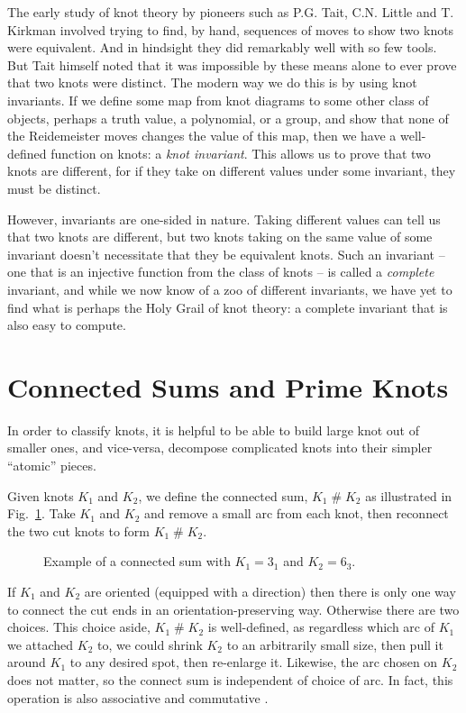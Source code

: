 \documentclass[12pt]{report}
\newcommand{\hash}{\ensuremath{\mathbin{\#}}}
\theoremstyle{upright}
\begin{document}
The early study of knot theory by pioneers such as P.G. Tait, C.N. Little and T. Kirkman involved trying to find, by hand, sequences of moves to show two knots were equivalent. And in hindsight they did remarkably well with so few tools. But Tait himself noted that it was impossible by these means alone to ever prove that two knots were distinct. The modern way we do this is by using knot invariants. If we define some map from knot diagrams to some other class of objects, perhaps a truth value, a polynomial, or a group, and show that none of the Reidemeister moves changes the value of this map, then we have a well-defined function on knots: a \textit{knot invariant}. This allows us to prove that two knots are different, for if they take on different values under some invariant, they must be distinct.

However, invariants are one-sided in nature. Taking different values can tell us that two knots are different, but two knots taking on the same value of some invariant doesn't necessitate that they be equivalent knots. Such an invariant -- one that is an injective function from the class of knots -- is called a \textit{complete} invariant, and while we now know of a zoo of different invariants, we have yet to find what is perhaps the Holy Grail of knot theory: a complete invariant that is also easy to compute.


\section{Connected Sums and Prime Knots}
In order to classify knots, it is helpful to be able to build large knot out of smaller ones, and vice-versa, decompose complicated knots into their simpler ``atomic'' pieces.

Given knots $K_{1}$ and $K_{2}$, we define the connected sum, $K_{1} \hash K_{2}$ as illustrated in Fig.~\ref{fig:connected-sum}. Take $K_{1}$ and $K_{2}$ and remove a small arc from each knot, then reconnect the two cut knots to form $K_{1} \hash K_{2}$.

\begin{figure}[hbt]
	\centering
	\def\svgscale{0.5}
	
	\caption{Example of a connected sum with $K_{1} = 3_{1}$ and $K_{2} = 6_{3}$.}
	\label{fig:connected-sum}
\end{figure}


If $K_{1}$ and $K_{2}$ are oriented (equipped with a direction) then there is only one way to connect the cut ends in an orientation-preserving way. Otherwise there are two choices. This choice aside, $K_{1} \hash K_{2}$ is well-defined, as regardless which arc of $K_{1}$ we attached $K_{2}$ to, we could shrink $K_{2}$ to an arbitrarily small size, then pull it around $K_{1}$ to any desired spot, then re-enlarge it. Likewise, the arc chosen on $K_{2}$ does not matter, so the connect sum is independent of choice of arc. In fact, this operation is also associative and commutative \cite[Corollary 7.13]{knots}.
\end{document}

